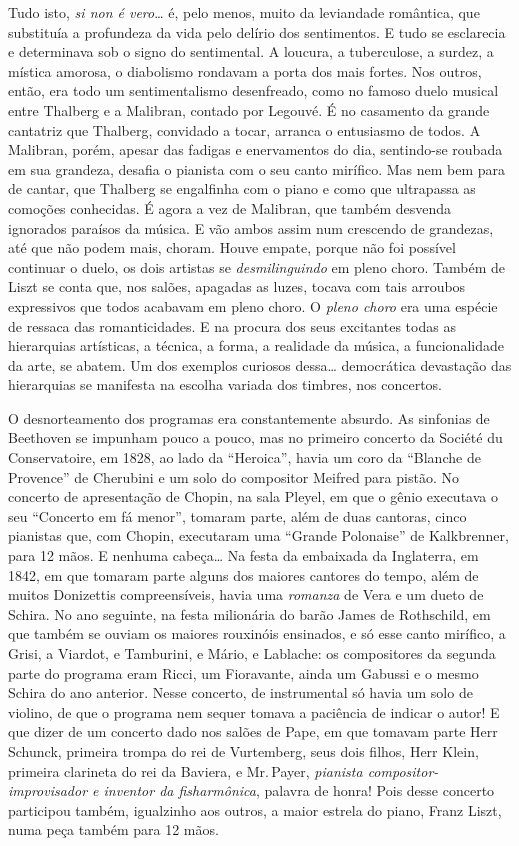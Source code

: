 Tudo isto, \textit{si non é vero}\ldots{} é, pelo menos, muito da leviandade
romântica, que substituía a profundeza da vida pelo delírio dos
sentimentos. E tudo se esclarecia e determinava sob o signo do
sentimental. A loucura, a tuberculose, a surdez, a mística amorosa, o
diabolismo rondavam a porta dos mais fortes. Nos outros, então, era todo
um sentimentalismo desenfreado, como no famoso duelo musical entre
Thalberg e a Malibran, contado por Legouvé. É no casamento da grande
cantatriz que Thalberg, convidado a tocar, arranca o entusiasmo de
todos. A Malibran, porém, apesar das fadigas e enervamentos do dia,
sentindo-se roubada em sua grandeza, desafia o pianista com o seu
canto mirífico. Mas nem bem para de cantar, que Thalberg se engalfinha
com o piano e como que ultrapassa as comoções conhecidas. É agora a vez
de Malibran, que também desvenda ignorados paraísos da música. E vão
ambos assim num crescendo de grandezas, até que não podem mais, choram.
Houve empate, porque não foi possível continuar o duelo, os dois
artistas se \textit{desmilinguindo} em pleno choro. Também de Liszt se conta que,
nos salões, apagadas as luzes, tocava com tais arroubos expressivos que
todos acabavam em pleno choro. O \textit{pleno choro} era uma espécie de
ressaca das romanticidades. E na procura dos seus excitantes todas as
hierarquias artísticas, a técnica, a forma, a realidade da música, a
funcionalidade da arte, se abatem. Um dos exemplos curiosos dessa\ldots{}
democrática devastação das hierarquias se manifesta na escolha variada
dos timbres, nos concertos.

O desnorteamento dos programas era constantemente absurdo. As sinfonias
de Beethoven se impunham pouco a pouco, mas no primeiro concerto da
Société du Conservatoire, em 1828, ao lado da ``Heroica'', havia um coro
da ``Blanche de Provence'' de Cherubini e um solo do compositor Meifred
para pistão. No concerto de apresentação de Chopin, na sala Pleyel, em
que o gênio executava o seu ``Concerto em fá menor'', tomaram parte,
além de duas cantoras, cinco pianistas que, com Chopin, executaram uma
``Grande Polonaise'' de Kalkbrenner, para 12 mãos. E nenhuma cabeça\ldots{}
Na festa da embaixada da Inglaterra, em 1842, em que tomaram parte
alguns dos maiores cantores do tempo, além de muitos Donizettis
compreensíveis, havia uma \textit{romanza} de Vera e um dueto de Schira. No
ano seguinte, na festa milionária do barão James de Rothschild, em que
também se ouviam os maiores rouxinóis ensinados, e só esse canto
mirífico, a Grisi, a Viardot, e Tamburini, e Mário, e Lablache: os
compositores da segunda parte do programa eram Ricci, um Fioravante,
ainda um Gabussi e o mesmo Schira do ano anterior. Nesse concerto, de
instrumental só havia um solo de violino, de que o programa nem sequer
tomava a paciência de indicar o autor! E que dizer de um concerto dado
nos salões de Pape, em que tomavam parte Herr Schunck, primeira trompa
do rei de Vurtemberg, seus dois filhos, Herr Klein, primeira clarineta
do rei da Baviera, e Mr.\,Payer, \textit{pianista compositor-improvisador e
inventor da fisharmônica}, palavra de honra! Pois desse concerto
participou também, igualzinho aos outros, a maior estrela do piano,
Franz Liszt, numa peça também para 12 mãos.

